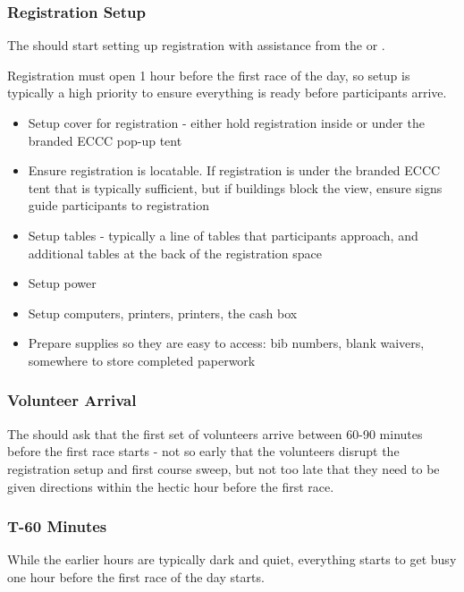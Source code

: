 \subsubsection{Registration Setup}

The  should start setting up registration with assistance from the  or .

Registration must open 1 hour before the first race of the day, so setup is typically a high priority to ensure everything is ready before participants arrive.

\begin{itemize}
  \item Setup cover for registration - either hold registration inside or under the branded ECCC pop-up tent
  \item Ensure registration is locatable. If registration is under the branded ECCC tent that is typically sufficient, but if buildings block the view,
    ensure signs guide participants to registration
  \item Setup tables - typically a line of tables that participants approach, and additional tables at the back of the registration space
  \item Setup power
  \item Setup computers, printers, printers, the cash box
  \item Prepare supplies so they are easy to access: bib numbers, blank waivers, somewhere to store completed paperwork
\end{itemize}

\subsubsection{Volunteer Arrival}

The  should ask that the first set of volunteers arrive between 60-90 minutes before the first race starts -
not so early that the volunteers disrupt the registration setup and first course sweep, but not too late that they need to be given directions
within the hectic hour before the first race.

\subsubsection{T-60 Minutes}

While the earlier hours are typically dark and quiet, everything starts to get busy one hour before the first race of the day starts.

